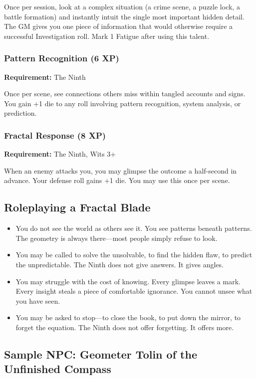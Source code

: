 Once per session, look at a complex situation (a crime scene, a puzzle lock, a battle formation) and instantly intuit the single most important hidden detail. The GM gives you one piece of information that would otherwise require a successful Investigation roll. Mark 1 Fatigue after using this talent.

\subsubsection{Pattern Recognition (6 XP)}

\textbf{Requirement:} The Ninth

Once per scene, see connections others miss within tangled accounts and signs. You gain +1 die to any roll involving pattern recognition, system analysis, or prediction.

\subsubsection{Fractal Response (8 XP)}

\textbf{Requirement:} The Ninth, Wits 3+

When an enemy attacks you, you may glimpse the outcome a half-second in advance. Your defense roll gains +1 die. You may use this once per scene.

\subsection{Roleplaying a Fractal Blade}

\begin{itemize}
\item You do not see the world as others see it. You see patterns beneath patterns. The geometry is always there—most people simply refuse to look.
\item You may be called to solve the unsolvable, to find the hidden flaw, to predict the unpredictable. The Ninth does not give answers. It gives angles.
\item You may struggle with the cost of knowing. Every glimpse leaves a mark. Every insight steals a piece of comfortable ignorance. You cannot unsee what you have seen.
\item You may be asked to stop—to close the book, to put down the mirror, to forget the equation. The Ninth does not offer forgetting. It offers more.
\end{itemize}

\subsection{Sample NPC: Geometer Tolin of the Unfinished Compass}


